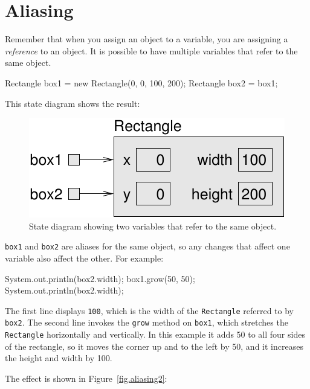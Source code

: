 \documentclass[12pt]{book}
\theoremstyle{exercise}
\newcommand{\java}[1]{\verb"#1"}
\begin{document}
\section{Aliasing}
\label{aliasing}


Remember that when you assign an object to a variable, you are assigning a {\em reference} to an object.
It is possible to have multiple variables that refer to the same object.

\begin{code}
    Rectangle box1 = new Rectangle(0, 0, 100, 200);
    Rectangle box2 = box1;
\end{code}

This state diagram shows the result:

\begin{figure}
\begin{center}
\includegraphics{figs/aliasing.pdf}
\caption{State diagram showing two variables that refer to the same object.}
\label{figs.aliasing}
\end{center}
\end{figure}


\java{box1} and \java{box2} are aliases for the same object, so any changes that affect one variable also affect the other.
For example:

\begin{code}
    System.out.println(box2.width);
    box1.grow(50, 50);
    System.out.println(box2.width);
\end{code}

The first line displays {\tt 100}, which is the width of the \java{Rectangle} referred to by \java{box2}.
The second line invokes the \java{grow} method on \java{box1}, which stretches the \java{Rectangle} horizontally and vertically.  In this example it adds 50 to all four sides of the rectangle, so it moves the corner up and to the left by 50, and it increases the height and width by 100.

The effect is shown in Figure~\ref{fig.aliasing2}:
\end{document}
